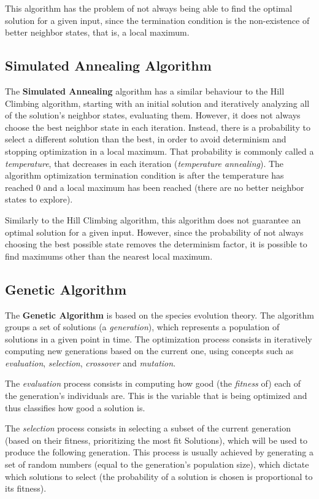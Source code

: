 \documentclass[conference]{IEEEtran}
\begin{document}
This algorithm has the problem of not always being able to find the optimal solution for a given input, since the termination condition is the non-existence of better neighbor states, that is, a local maximum.

\subsection{Simulated Annealing Algorithm}

The \textbf{Simulated Annealing} algorithm has a similar behaviour to the Hill Climbing algorithm, starting with an initial solution and iteratively analyzing all of the solution's neighbor states, evaluating them. However, it does not always choose the best neighbor state in each iteration. Instead, there is a probability to select a different solution than the best, in order to avoid determinism and stopping optimization in a local maximum. That probability is commonly called a \textit{temperature}, that decreases in each iteration (\textit{temperature annealing}). The algorithm optimization termination condition is after the temperature has reached 0 and a local maximum has been reached (there are no better neighbor states to explore).

Similarly to the Hill Climbing algorithm, this algorithm does not guarantee an optimal solution for a given input. However, since the probability of not always choosing the best possible state removes the determinism factor, it is possible to find maximums other than the nearest local maximum.

\subsection{Genetic Algorithm}

The \textbf{Genetic Algorithm} is based on the species evolution theory. The algorithm groups a set of solutions (a \textit{generation}), which represents a population of solutions in a given point in time. The optimization process consists in iteratively computing new generations based on the current one, using concepts such as \textit{evaluation}, \textit{selection}, \textit{crossover} and \textit{mutation}. 

The \textit{evaluation} process consists in computing how good (the \textit{fitness} of) each of the generation's individuals are. This is the variable that is being optimized and thus classifies how good a solution is.

The \textit{selection} process consists in selecting a subset of the current generation (based on their fitness, prioritizing the most fit Solutions), which will be used to produce the following generation. This process is usually achieved by generating a set of random numbers (equal to the generation's population size), which dictate which solutions to select (the probability of a solution is chosen is proportional to its fitness).
\end{document}
